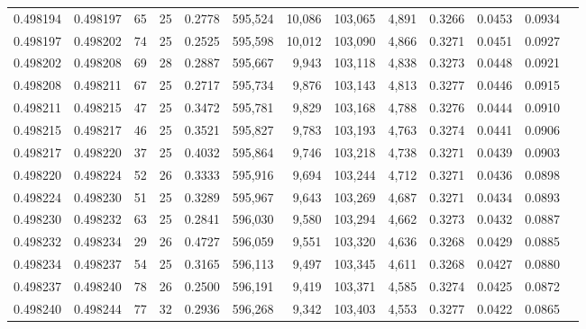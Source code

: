 \begin{tabular}{rrrrrrrrrrrrr}
0.498194 & 0.498197 &  65 &  25 &                                     0.2778 & 595,524 &  10,086 & 103,065 &   4,891 & 0.3266 & 0.0453 & 0.0934 \\
0.498197 & 0.498202 &  74 &  25 &                                     0.2525 & 595,598 &  10,012 & 103,090 &   4,866 & 0.3271 & 0.0451 & 0.0927 \\
0.498202 & 0.498208 &  69 &  28 &                                     0.2887 & 595,667 &   9,943 & 103,118 &   4,838 & 0.3273 & 0.0448 & 0.0921 \\
0.498208 & 0.498211 &  67 &  25 &                                     0.2717 & 595,734 &   9,876 & 103,143 &   4,813 & 0.3277 & 0.0446 & 0.0915 \\
0.498211 & 0.498215 &  47 &  25 &                                     0.3472 & 595,781 &   9,829 & 103,168 &   4,788 & 0.3276 & 0.0444 & 0.0910 \\
0.498215 & 0.498217 &  46 &  25 &                                     0.3521 & 595,827 &   9,783 & 103,193 &   4,763 & 0.3274 & 0.0441 & 0.0906 \\
0.498217 & 0.498220 &  37 &  25 &                                     0.4032 & 595,864 &   9,746 & 103,218 &   4,738 & 0.3271 & 0.0439 & 0.0903 \\
0.498220 & 0.498224 &  52 &  26 &                                     0.3333 & 595,916 &   9,694 & 103,244 &   4,712 & 0.3271 & 0.0436 & 0.0898 \\
0.498224 & 0.498230 &  51 &  25 &                                     0.3289 & 595,967 &   9,643 & 103,269 &   4,687 & 0.3271 & 0.0434 & 0.0893 \\
0.498230 & 0.498232 &  63 &  25 &                                     0.2841 & 596,030 &   9,580 & 103,294 &   4,662 & 0.3273 & 0.0432 & 0.0887 \\
0.498232 & 0.498234 &  29 &  26 &                                     0.4727 & 596,059 &   9,551 & 103,320 &   4,636 & 0.3268 & 0.0429 & 0.0885 \\
0.498234 & 0.498237 &  54 &  25 &                                     0.3165 & 596,113 &   9,497 & 103,345 &   4,611 & 0.3268 & 0.0427 & 0.0880 \\
0.498237 & 0.498240 &  78 &  26 &                                     0.2500 & 596,191 &   9,419 & 103,371 &   4,585 & 0.3274 & 0.0425 & 0.0872 \\
0.498240 & 0.498244 &  77 &  32 &                                     0.2936 & 596,268 &   9,342 & 103,403 &   4,553 & 0.3277 & 0.0422 & 0.0865 \\

\end{tabular}
